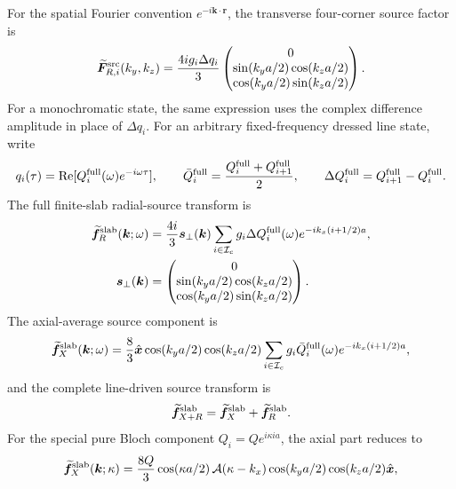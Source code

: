 \documentclass[10pt,aps,onecolumn,notitlepage,nofootinbib]{revtex4-2}
\newcommand{\vk}{\bm k}
\newcommand{\vf}{\bm f}
\newcommand{\vF}{\bm F}
\begin{document}
For the spatial Fourier convention $e^{-i\vk\cdot\bm r}$, the transverse four-corner source factor is
\begin{equation}
  \widetilde{\vF}^{\rm src}_{R,i}(k_y,k_z)
  =\frac{4ig_i\Delta q_i}{3}
  \begin{pmatrix}
    0\\
    \sin(k_ya/2)\cos(k_za/2)\\
    \cos(k_ya/2)\sin(k_za/2)
  \end{pmatrix}.
  \label{eq:sm-local-fourier}
\end{equation}
For a monochromatic state, the same expression uses the complex difference amplitude in place of $\Delta q_i$. For an arbitrary fixed-frequency dressed line state, write
\begin{equation}
 q_i(\tau)=\operatorname{Re}[Q_i^{\rm full}(\omega)e^{-i\omega\tau}],
 \qquad
 \bar Q_i^{\rm full}=\frac{Q_i^{\rm full}+Q_{i+1}^{\rm full}}{2},
 \qquad
 \Delta Q_i^{\rm full}=Q_{i+1}^{\rm full}-Q_i^{\rm full}.
\end{equation}
The full finite-slab radial-source transform is
\begin{align}
 \widetilde{\vf}^{\rm slab}_{R}(\vk;\omega)
 &=\frac{4i}{3}\bm s_\perp(\vk)
 \sum_{i\in\mathcal I_c}g_i\Delta Q_i^{\rm full}(\omega)
 e^{-ik_x(i+1/2)a},\\
 \bm s_\perp(\vk)&=
 \begin{pmatrix}
 0\\ \sin(k_ya/2)\cos(k_za/2)\\
 \cos(k_ya/2)\sin(k_za/2)
 \end{pmatrix}.
\end{align}
The axial-average source component is
\begin{equation}
 \widetilde{\vf}^{\rm slab}_{X}(\vk;\omega)
 =\frac{8}{3}\hat{\bm x}
 \cos(k_ya/2)\cos(k_za/2)
 \sum_{i\in\mathcal I_c}g_i\bar Q_i^{\rm full}(\omega)
 e^{-ik_x(i+1/2)a},
\end{equation}
and the complete line-driven source transform is
\begin{equation}
 \widetilde{\vf}^{\rm slab}_{X+R}
 =\widetilde{\vf}^{\rm slab}_{X}
 +\widetilde{\vf}^{\rm slab}_{R}.
\end{equation}
For the special pure Bloch component $Q_i=Qe^{i\kappa ia}$, the axial part reduces to
\begin{equation}
 \widetilde{\vf}^{\rm slab}_{X}(\vk;\kappa)
 =\frac{8Q}{3}\cos(\kappa a/2)\,
 \mathcal A(\kappa-k_x)
 \cos(k_ya/2)\cos(k_za/2)\hat{\bm x},
\end{equation}
\end{document}
